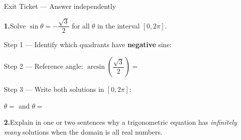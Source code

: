 \documentclass[10pt]{article}
\begin{document}
\namedateperiod

\vspace{0.10in}

\begin{notesbox}{Exit Ticket --- Answer independently}

\textbf{1.}\quad Solve $\sin\theta = -\dfrac{\sqrt{3}}{2}$ for all $\theta$
in the interval $[0, 2\pi]$.

\vspace{4pt}
Step 1 --- Identify which quadrants have \textbf{negative} sine:
\writeline

\vspace{4pt}
Step 2 --- Reference angle: $\arcsin\!\left(\dfrac{\sqrt{3}}{2}\right) = $ \blank{2cm}

\vspace{4pt}
Step 3 --- Write both solutions in $[0, 2\pi]$:

\vspace{4pt}
$\theta = $ \blank{2.5cm} and $\theta = $ \blank{2.5cm}

\vspace{0.16in}
\textbf{2.}\quad Explain in one or two sentences why a trigonometric equation
has \emph{infinitely many} solutions when the domain is all real numbers.


\end{notesbox}
\end{document}
